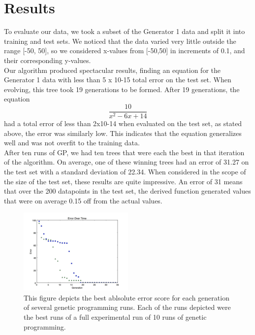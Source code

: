
\section{Results}
\label{sec:results}

     To evaluate our data, we took a subset of the Generator 1 data
and split it into training and test sets. We noticed that the
data varied very little outside the range [-50, 50], so we
considered x-values from [-50,50] in increments of 0.1, and
their corresponding y-values.\\

Our algorithm produced spectacular results, finding an equation for
the Generator 1 data with less than 5 x 10-15 total error on the test
set. When evolving, this tree took 19 generations to be formed. After
19 generations, the equation  $$\frac{10}{x^2-6x+14}$$  had a total error of
less than 2x10-14 when evaluated on the test set, as stated above, the
error was similarly low. This indicates that the equation generalizes
well and was not overfit to the training data.\\

After ten runs of GP, we had ten trees that were each the best in that iteration of the algorithm. On average, one of these winning trees had an error of 31.27 on the test set with a standard deviation of 22.34. When considered in the scope of the size of the test set, these results are quite impressive. An error of 31 means that over the 200 datapoints in the test set, the derived function generated values that were on average 0.15 off from the actual values.\\

\begin{figure}[htb]

  \centering  %

  \includegraphics[width=0.5\textwidth]{figs/Generator1.jpg}

  \caption{This figure depicts the best ablsolute error score for each
    generation of several genetic programming runs. Each of the runs
    depicted were the best runs of a full experimental run of 10 runs of
    genetic programming.}


  \label{fig:tex}

\end{figure}

